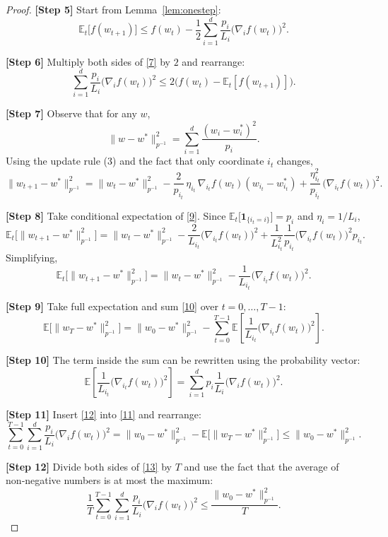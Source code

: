 \documentclass{article}
\newcommand{\E}{\mathbb{E}}
\begin{document}
\begin{proof}
\textbf{[Step 5]} Start from Lemma~\ref{lem:onestep}:
\[
\E_t\!\bigl[f(w_{t+1})\bigr]
\le f(w_t)-\frac{1}{2}\sum_{i=1}^{d}\frac{p_i}{L_i}\bigl(\nabla_i f(w_t)\bigr)^{2}.
\tag{7}
\]

\textbf{[Step 6]} Multiply both sides of \eqref{7} by $2$ and rearrange:
\[
\sum_{i=1}^{d}\frac{p_i}{L_i}\bigl(\nabla_i f(w_t)\bigr)^{2}
\le 2\bigl(f(w_t)-\E_t[f(w_{t+1})]\bigr).
\tag{8}
\]

\textbf{[Step 7]} Observe that for any $w$,
\[
\|w-w^{*}\|_{p^{-1}}^{2}
= \sum_{i=1}^{d}\frac{(w_i-w^{*}_i)^{2}}{p_i}.
\]
Using the update rule (3) and the fact that only coordinate $i_t$ changes,
\[
\|w_{t+1}-w^{*}\|_{p^{-1}}^{2}
= \|w_t-w^{*}\|_{p^{-1}}^{2}
-\frac{2}{p_{i_t}}\,\eta_{i_t}\,\nabla_{i_t}f(w_t)(w_{i_t}-w^{*}_{i_t})
+\frac{\eta_{i_t}^{2}}{p_{i_t}}\,\bigl(\nabla_{i_t}f(w_t)\bigr)^{2}.
\tag{9}
\]

\textbf{[Step 8]} Take conditional expectation of \eqref{9}.  
Since $\E_t\!\bigl[ \mathbf{1}_{\{i_t=i\}}\bigr]=p_i$ and $\eta_i=1/L_i$,
\[
\E_t\!\bigl[\|w_{t+1}-w^{*}\|_{p^{-1}}^{2}\bigr]
= \|w_t-w^{*}\|_{p^{-1}}^{2}
-\frac{2}{L_{i_t}}\bigl(\nabla_{i_t}f(w_t)\bigr)^{2}
+\frac{1}{L_{i_t}^{2}}\frac{1}{p_{i_t}}\bigl(\nabla_{i_t}f(w_t)\bigr)^{2}p_{i_t}.
\]
Simplifying,
\[
\E_t\!\bigl[\|w_{t+1}-w^{*}\|_{p^{-1}}^{2}\bigr]
= \|w_t-w^{*}\|_{p^{-1}}^{2}
-\frac{1}{L_{i_t}}\bigl(\nabla_{i_t}f(w_t)\bigr)^{2}.
\tag{10}
\]

\textbf{[Step 9]} Take full expectation and sum \eqref{10} over $t=0,\dots ,T-1$:
\[
\E\!\bigl[\|w_T-w^{*}\|_{p^{-1}}^{2}\bigr]
= \|w_0-w^{*}\|_{p^{-1}}^{2}
-\sum_{t=0}^{T-1}\E\!\left[\frac{1}{L_{i_t}}\bigl(\nabla_{i_t}f(w_t)\bigr)^{2}\right].
\tag{11}
\]

\textbf{[Step 10]} The term inside the sum can be rewritten using the probability vector:
\[
\E\!\left[\frac{1}{L_{i_t}}\bigl(\nabla_{i_t}f(w_t)\bigr)^{2}\right]
= \sum_{i=1}^{d}p_i\frac{1}{L_i}\bigl(\nabla_i f(w_t)\bigr)^{2}.
\tag{12}
\]

\textbf{[Step 11]} Insert \eqref{12} into \eqref{11} and rearrange:
\[
\sum_{t=0}^{T-1}\sum_{i=1}^{d}\frac{p_i}{L_i}\bigl(\nabla_i f(w_t)\bigr)^{2}
= \|w_0-w^{*}\|_{p^{-1}}^{2}
-\E\!\bigl[\|w_T-w^{*}\|_{p^{-1}}^{2}\bigr]
\le \|w_0-w^{*}\|_{p^{-1}}^{2}.
\tag{13}
\]

\textbf{[Step 12]} Divide both sides of \eqref{13} by $T$ and use the fact that the average of non‑negative numbers is at most the maximum:
\[
\frac{1}{T}\sum_{t=0}^{T-1}\sum_{i=1}^{d}\frac{p_i}{L_i}\bigl(\nabla_i f(w_t)\bigr)^{2}
\le \frac{\|w_0-w^{*}\|_{p^{-1}}^{2}}{T}.
\tag{14}
\]


\end{proof}
\end{document}
